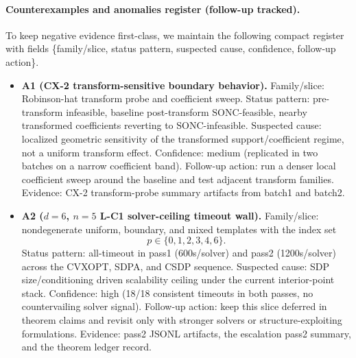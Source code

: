 \documentclass{article}
\begin{document}
\paragraph{Counterexamples and anomalies register (follow-up tracked).}
To keep negative evidence first-class, we maintain the following compact register with fields
\{family/slice, status pattern, suspected cause, confidence, follow-up action\}.
\begin{itemize}
    \item \textbf{A1 (CX-2 transform-sensitive boundary behavior).}
    Family/slice: Robinson-hat transform probe and coefficient sweep.
    Status pattern: pre-transform infeasible, baseline post-transform SONC-feasible,
    nearby transformed coefficients reverting to SONC-infeasible.
    Suspected cause: localized geometric sensitivity of the transformed support/coefficient regime,
    not a uniform transform effect.
    Confidence: medium (replicated in two batches on a narrow coefficient band).
    Follow-up action: run a denser local coefficient sweep around the baseline and test adjacent
    transform families.
    Evidence: CX-2 transform-probe summary artifacts from batch1 and batch2.
    \item \textbf{A2 ($d=6$, $n=5$ L-C1 solver-ceiling timeout wall).}
    Family/slice: nondegenerate uniform, boundary, and mixed templates with
    the index set
    \[
    p\in\{0,1,2,3,4,6\}.
    \]
    Status pattern: all-timeout in pass1 (600s/solver) and pass2 (1200s/solver)
    across the CVXOPT, SDPA, and CSDP sequence.
    Suspected cause: SDP size/conditioning driven scalability ceiling under the current
    interior-point stack.
    Confidence: high (18/18 consistent timeouts in both passes, no countervailing solver signal).
    Follow-up action: keep this slice deferred in theorem claims and revisit only with stronger
    solvers or structure-exploiting formulations.
    Evidence: pass2 JSONL artifacts, the escalation pass2 summary, and the theorem ledger record.
\end{itemize}
\end{document}
